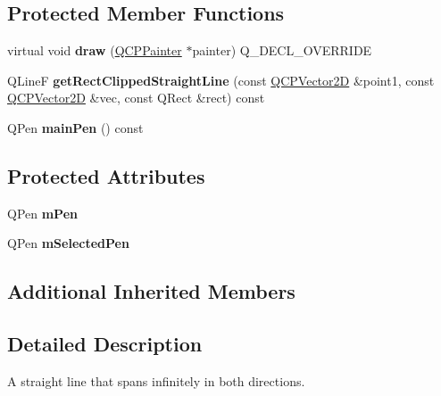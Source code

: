 \subsection*{Protected Member Functions}
\begin{DoxyCompactItemize}
\item 
\mbox{\label{classQCPItemStraightLine_acbc84ad219bf4845152e4e2202fcaa3c}} 
virtual void {\bfseries draw} (\hyperlink{classQCPPainter}{Q\+C\+P\+Painter} $\ast$painter) Q\+\_\+\+D\+E\+C\+L\+\_\+\+O\+V\+E\+R\+R\+I\+DE
\item 
\mbox{\label{classQCPItemStraightLine_ae1de3d4121c06e5ffea4961722a54f5e}} 
Q\+LineF {\bfseries get\+Rect\+Clipped\+Straight\+Line} (const \hyperlink{classQCPVector2D}{Q\+C\+P\+Vector2D} \&point1, const \hyperlink{classQCPVector2D}{Q\+C\+P\+Vector2D} \&vec, const Q\+Rect \&rect) const
\item 
\mbox{\label{classQCPItemStraightLine_a5b1a39cfc54c3e22f65de2958d40eb59}} 
Q\+Pen {\bfseries main\+Pen} () const
\end{DoxyCompactItemize}
\subsection*{Protected Attributes}
\begin{DoxyCompactItemize}
\item 
\mbox{\label{classQCPItemStraightLine_a15106ddc2ebd73ed5c1bc57aa92bee8f}} 
Q\+Pen {\bfseries m\+Pen}
\item 
\mbox{\label{classQCPItemStraightLine_a0307a0d56a018656adbf798bc84c2a4b}} 
Q\+Pen {\bfseries m\+Selected\+Pen}
\end{DoxyCompactItemize}
\subsection*{Additional Inherited Members}


\subsection{Detailed Description}
A straight line that spans infinitely in both directions. 

